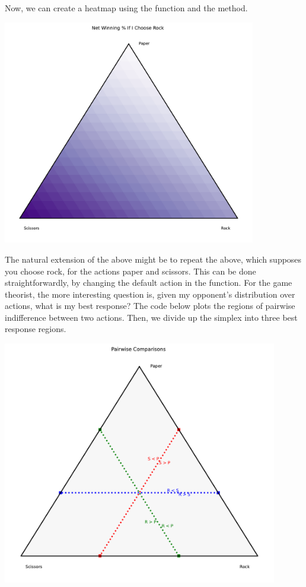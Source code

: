
Now, we can create a heatmap using the function  and the  method. 


\begin{center}
    \includegraphics[width = 0.83\textwidth]{figures/specialplots/heat-rps.pdf}
\end{center}


The natural extension of the above might be to repeat the above, which supposes you choose rock, for the actions paper and scissors. This can be done straightforwardly, by changing the default action in the  function. For the game theorist, the more interesting question is, given my opponent's distribution over actions, what is my best response? The code below plots the regions of pairwise indifference between two actions. Then, we divide up the simplex into three best response regions. 


\begin{center}
    \includegraphics[width = 0.9\textwidth]{figures/specialplots/rps-br-lines.pdf}
\end{center}


